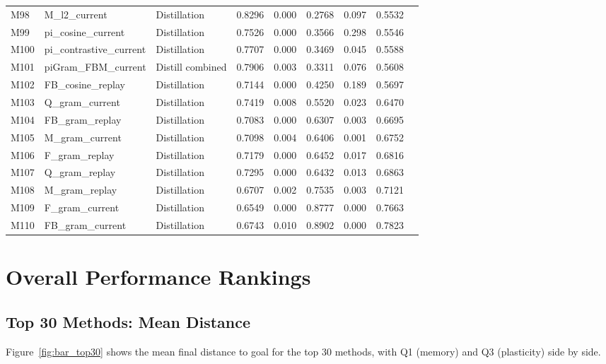\documentclass[11pt,a4paper]{article}
\begin{document}
\begin{small}
\begin{longtable}{llp{3cm}rrrrrr}
    M98 & M\_l2\_current & Distillation & 0.8296 & 0.000 & 0.2768 & 0.097 & 0.5532 \\
    M99 & pi\_cosine\_current & Distillation & 0.7526 & 0.000 & 0.3566 & 0.298 & 0.5546 \\
    M100 & pi\_contrastive\_current & Distillation & 0.7707 & 0.000 & 0.3469 & 0.045 & 0.5588 \\
    M101 & piGram\_FBM\_current & Distill combined & 0.7906 & 0.003 & 0.3311 & 0.076 & 0.5608 \\
    M102 & FB\_cosine\_replay & Distillation & 0.7144 & 0.000 & 0.4250 & 0.189 & 0.5697 \\
    M103 & Q\_gram\_current & Distillation & 0.7419 & 0.008 & 0.5520 & 0.023 & 0.6470 \\
    M104 & FB\_gram\_replay & Distillation & 0.7083 & 0.000 & 0.6307 & 0.003 & 0.6695 \\
    M105 & M\_gram\_current & Distillation & 0.7098 & 0.004 & 0.6406 & 0.001 & 0.6752 \\
    M106 & F\_gram\_replay & Distillation & 0.7179 & 0.000 & 0.6452 & 0.017 & 0.6816 \\
    M107 & Q\_gram\_replay & Distillation & 0.7295 & 0.000 & 0.6432 & 0.013 & 0.6863 \\
    M108 & M\_gram\_replay & Distillation & 0.6707 & 0.002 & 0.7535 & 0.003 & 0.7121 \\
    M109 & F\_gram\_current & Distillation & 0.6549 & 0.000 & 0.8777 & 0.000 & 0.7663 \\
    M110 & FB\_gram\_current & Distillation & 0.6743 & 0.010 & 0.8902 & 0.000 & 0.7823 \\
\end{longtable}
\end{small}

\section{Overall Performance Rankings}

\subsection{Top 30 Methods: Mean Distance}
Figure~\ref{fig:bar_top30} shows the mean final distance to goal for the top 30 methods,
with Q1 (memory) and Q3 (plasticity) side by side.
\end{document}
